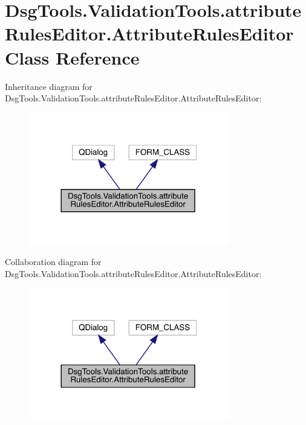 \hypertarget{class_dsg_tools_1_1_validation_tools_1_1attribute_rules_editor_1_1_attribute_rules_editor}{}\section{Dsg\+Tools.\+Validation\+Tools.\+attribute\+Rules\+Editor.\+Attribute\+Rules\+Editor Class Reference}
\label{class_dsg_tools_1_1_validation_tools_1_1attribute_rules_editor_1_1_attribute_rules_editor}


Inheritance diagram for Dsg\+Tools.\+Validation\+Tools.\+attribute\+Rules\+Editor.\+Attribute\+Rules\+Editor\+:
\nopagebreak
\begin{figure}[H]
\begin{center}
\leavevmode
\includegraphics[width=248pt]{class_dsg_tools_1_1_validation_tools_1_1attribute_rules_editor_1_1_attribute_rules_editor__inherit__graph}
\end{center}
\end{figure}


Collaboration diagram for Dsg\+Tools.\+Validation\+Tools.\+attribute\+Rules\+Editor.\+Attribute\+Rules\+Editor\+:
\nopagebreak
\begin{figure}[H]
\begin{center}
\leavevmode
\includegraphics[width=248pt]{class_dsg_tools_1_1_validation_tools_1_1attribute_rules_editor_1_1_attribute_rules_editor__coll__graph}
\end{center}
\end{figure}
